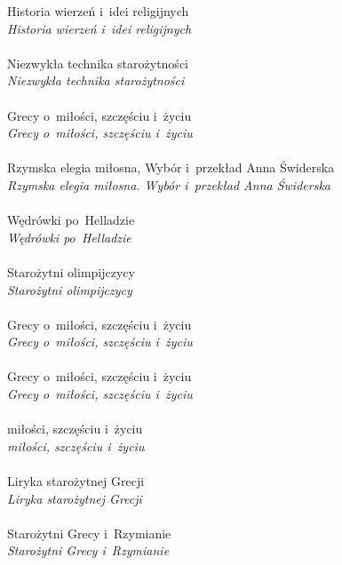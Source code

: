 \documentclass[a4paper,11pt]{article}
\numberwithin{equation}{section}
\begin{document}
\Jest Historia wierzeń i~idei religijnych \\
\PowinnoByc \textit{Historia wierzeń i~idei religijnych} \\
 \\
\Jest Niezwykła technika starożytności \\
\PowinnoByc \textit{Niezwykła technika starożytności} \\
 \\
\Jest Grecy o~miłości, szczęściu i~życiu \\
\PowinnoByc \textit{Grecy o~miłości, szczęściu i~życiu} \\
 \\
\Jest Rzymska elegia miłosna, Wybór i~przekład Anna Świderska \\
\PowinnoByc \textit{Rzymska elegia miłosna. Wybór i~przekład Anna
  Świderska} \\
 \\
\Jest Wędrówki po~Helladzie \\
\PowinnoByc \textit{Wędrówki po~Helladzie} \\
 \\
\Jest Starożytni olimpijczycy \\
\PowinnoByc \textit{Starożytni olimpijczycy} \\
 \\
\Jest Grecy o~miłości, szczęściu i~życiu \\
\PowinnoByc \textit{Grecy o~miłości, szczęściu i~życiu} \\
 \\
\Jest Grecy o~miłości, szczęściu i~życiu \\
\PowinnoByc \textit{Grecy o~miłości, szczęściu i~życiu} \\
 \\
\Jest miłości, szczęściu i~życiu \\
\PowinnoByc \textit{miłości, szczęściu i~życiu} \\
 \\
\Jest Liryka starożytnej Grecji \\
\PowinnoByc \textit{Liryka starożytnej Grecji} \\
 \\
\Jest Starożytni Grecy i~Rzymianie \\
\PowinnoByc \textit{Starożytni Grecy i~Rzymianie} \\
\end{document}
